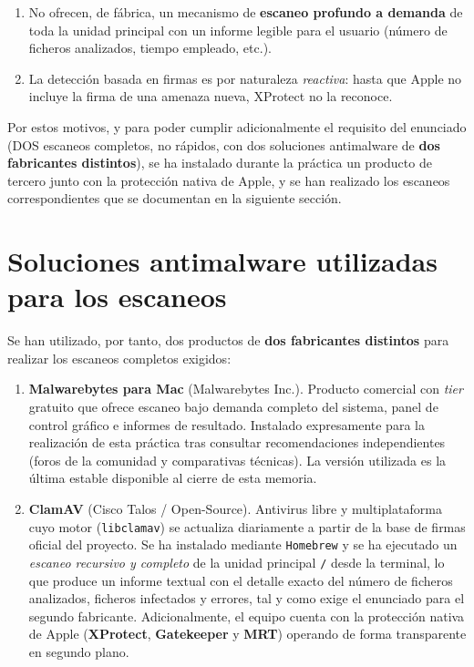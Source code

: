 \begin{enumerate}[leftmargin=*]
    \item No ofrecen, de fábrica, un mecanismo de \textbf{escaneo profundo a demanda} de toda la unidad principal con un informe legible para el usuario (número de ficheros analizados, tiempo empleado, etc.).
    \item La detección basada en firmas es por naturaleza \textit{reactiva}: hasta que Apple no incluye la firma de una amenaza nueva, XProtect no la reconoce.
\end{enumerate}

Por estos motivos, y para poder cumplir adicionalmente el requisito del enunciado (DOS escaneos completos, no rápidos, con dos soluciones antimalware de \textbf{dos fabricantes distintos}), se ha instalado durante la práctica un producto de tercero junto con la protección nativa de Apple, y se han realizado los escaneos correspondientes que se documentan en la siguiente sección.

\section{Soluciones antimalware utilizadas para los escaneos}

Se han utilizado, por tanto, dos productos de \textbf{dos fabricantes distintos} para realizar los escaneos completos exigidos:

\begin{enumerate}[leftmargin=*]
    \item \textbf{Malwarebytes para Mac} (Malwarebytes Inc.). Producto comercial con \textit{tier} gratuito que ofrece escaneo bajo demanda completo del sistema, panel de control gráfico e informes de resultado. Instalado expresamente para la realización de esta práctica tras consultar recomendaciones independientes (foros de la comunidad y comparativas técnicas). La versión utilizada es la última estable disponible al cierre de esta memoria.
    \item \textbf{ClamAV} (Cisco Talos / Open-Source). Antivirus libre y multiplataforma cuyo motor (\texttt{libclamav}) se actualiza diariamente a partir de la base de firmas oficial del proyecto. Se ha instalado mediante \texttt{Homebrew} y se ha ejecutado un \textit{escaneo recursivo y completo} de la unidad principal \texttt{/} desde la terminal, lo que produce un informe textual con el detalle exacto del número de ficheros analizados, ficheros infectados y errores, tal y como exige el enunciado para el segundo fabricante. Adicionalmente, el equipo cuenta con la protección nativa de Apple (\textbf{XProtect}, \textbf{Gatekeeper} y \textbf{MRT}) operando de forma transparente en segundo plano.
\end{enumerate}

